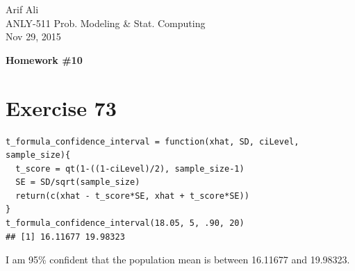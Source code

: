 \documentclass{article}\usepackage[]{graphicx}\usepackage[]{color}
\makeatletter
\newenvironment{kframe}{%
 \def\at@end@of@kframe{}%
 \ifinner\ifhmode%
  \def\at@end@of@kframe{\end{minipage}}%
  \begin{minipage}{\columnwidth}%
 \fi\fi%
 \def\FrameCommand##1{\hskip\@totalleftmargin \hskip-\fboxsep
 \colorbox{shadecolor}{##1}\hskip-\fboxsep
     \hskip-\linewidth \hskip-\@totalleftmargin \hskip\columnwidth}%
 \MakeFramed {\advance\hsize-\width
   \@totalleftmargin\z@ \linewidth\hsize
   \@setminipage}}%
 {\par\unskip\endMakeFramed%
 \at@end@of@kframe}
\newenvironment{knitrout}{}{} %
\makeatother
\begin{document}
\begin{flushright}
  Arif Ali\\
  ANLY-511 Prob. Modeling \& Stat. Computing\\
	Nov 29, 2015\\
\end{flushright}

\begin{center}
  \LARGE\textbf{Homework \#10}
\end{center}
\section*{Exercise 73}
\begin{knitrout}
\color{fgcolor}\begin{kframe}
\begin{verbatim}
t_formula_confidence_interval = function(xhat, SD, ciLevel, sample_size){
  t_score = qt(1-((1-ciLevel)/2), sample_size-1)
  SE = SD/sqrt(sample_size) 
  return(c(xhat - t_score*SE, xhat + t_score*SE))
}
t_formula_confidence_interval(18.05, 5, .90, 20)
## [1] 16.11677 19.98323
\end{verbatim}
\end{kframe}
\end{knitrout}
I am 95\% confident that the population mean is between 16.11677 and 19.98323.
\end{document}
